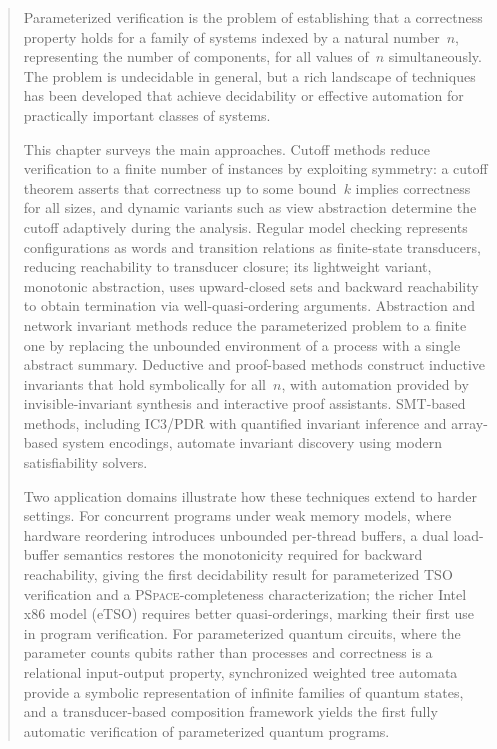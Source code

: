 \begin{abstract}
Parameterized verification is the problem of establishing that a correctness
property holds for a family of systems indexed by a natural number~$n$,
representing the number of components, for all values of~$n$ simultaneously.
The problem is undecidable in general, but a rich landscape of techniques has
been developed that achieve decidability or effective automation for
practically important classes of systems.

This chapter surveys the main approaches. Cutoff methods reduce verification
to a finite number of instances by exploiting symmetry: a cutoff theorem
asserts that correctness up to some bound~$k$ implies correctness for all
sizes, and dynamic variants such as view abstraction determine the cutoff
adaptively during the analysis. Regular model checking represents
configurations as words and transition relations as finite-state transducers,
reducing reachability to transducer closure; its lightweight variant,
monotonic abstraction, uses upward-closed sets and backward reachability to
obtain termination via well-quasi-ordering arguments. Abstraction and network
invariant methods reduce the parameterized problem to a finite one by
replacing the unbounded environment of a process with a single abstract
summary. Deductive and proof-based methods construct inductive invariants that
hold symbolically for all~$n$, with automation provided by invisible-invariant
synthesis and interactive proof assistants. SMT-based methods, including
IC3/PDR with quantified invariant inference and array-based system encodings,
automate invariant discovery using modern satisfiability solvers.

Two application domains illustrate how these techniques extend to harder
settings. For concurrent programs under weak memory models, where hardware
reordering introduces unbounded per-thread buffers, a dual load-buffer
semantics restores the monotonicity required for backward reachability, giving
the first decidability result for parameterized TSO verification and a
\textsc{PSpace}-completeness characterization; the richer Intel x86 model
(eTSO) requires better quasi-orderings, marking their first use in program
verification. For parameterized quantum circuits, where the parameter counts
qubits rather than processes and correctness is a relational input-output
property, synchronized weighted tree automata provide a symbolic
representation of infinite families of quantum states, and a transducer-based
composition framework yields the first fully automatic verification of
parameterized quantum programs.
\end{abstract}

